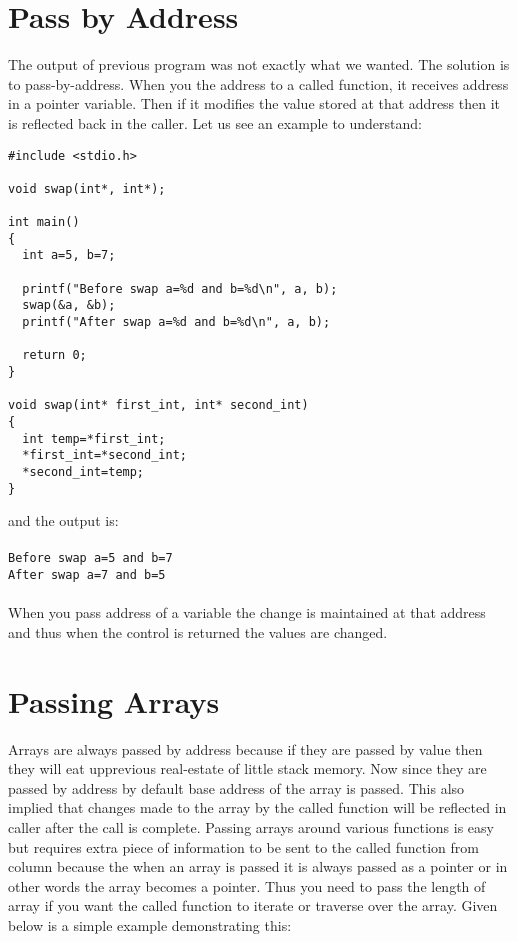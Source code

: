 \section{Pass by Address}
\label{section:Pass by address}
The output of previous program was not exactly what we wanted. The solution is
to pass-by-address. When you the address to a called function, it receives
address in a pointer variable. Then if it modifies the value stored at that
address then it is reflected back in the caller. Let us see an example to
understand:

\begin{verbatim}
#include <stdio.h>

void swap(int*, int*);

int main()
{
  int a=5, b=7;

  printf("Before swap a=%d and b=%d\n", a, b);
  swap(&a, &b);
  printf("After swap a=%d and b=%d\n", a, b);

  return 0;
}

void swap(int* first_int, int* second_int)
{
  int temp=*first_int;
  *first_int=*second_int;
  *second_int=temp;
}
\end{verbatim}
and the output is:
\\\\\texttt{Before swap a=5 and b=7\\
After swap a=7 and b=5\\\\}
When you pass address of a variable the change is maintained at that address
and thus when the control is returned the values are changed.

\section{Passing Arrays}
Arrays are always passed by address because if they are passed by value then
they will eat upprevious real-estate of little stack memory. Now since they
are passed by address by default base address of the array is passed. This
also implied that changes made to the array by the called function will be
reflected in caller after the call is complete. Passing arrays around various
functions is easy but requires extra piece of information to be sent to the
called function from column because the when an array is passed it is always
passed as a pointer or in other words the array becomes a pointer. Thus you
need to pass the length of array if you want the
called function to iterate or traverse over the array. Given below is a simple
example demonstrating this:


